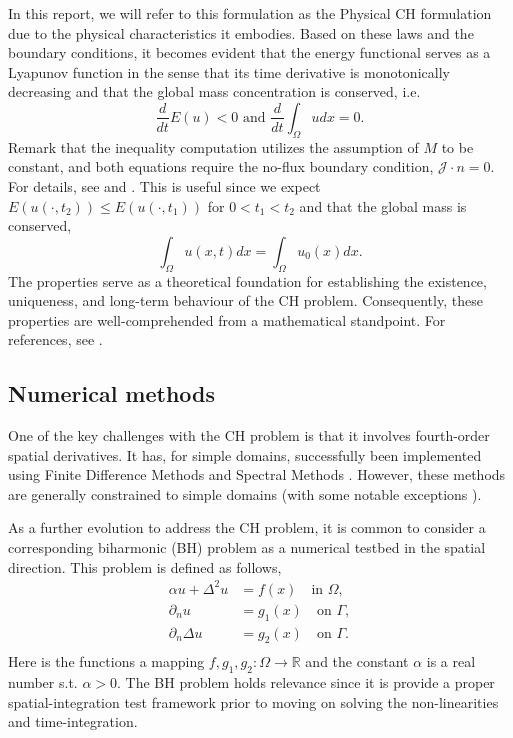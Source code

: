 In this report, we will refer to this formulation as the Physical CH formulation due to the physical characteristics it embodies.
Based on these laws and the boundary conditions, it becomes evident that the energy functional serves as a Lyapunov function in the sense that its time derivative is monotonically decreasing and that the global mass concentration is conserved, i.e.
\begin{equation}
\label{eq:mass_cons_energy_decrease}
\frac{d}{dt} E( u) <  0 \text{ and }\frac{d}{dt} \int_{\Omega }^{}  u dx = 0.
\end{equation}
Remark that the inequality computation utilizes the assumption of $M$ to be constant, and both equations require the no-flux boundary condition, $\mathcal{J} \cdot n = 0$.
For details, see \cite[Equation 17 ]{lee2014physical} and \cite[Equation 1.7]{garcke2020weak}.
This is useful since we expect $E( u( \cdot , t_{2}) ) \le  E( u( \cdot , t_{1}) ) $ for $0 < t_{1} < t_{2} $ and that the global mass is conserved, \[
\int_{\Omega }^{} u ( x,t)  dx = \int_{\Omega }^{} u_{0}(x)  dx.
\]
The properties serve as a theoretical foundation for establishing the existence, uniqueness, and long-term behaviour of the CH problem. Consequently, these properties are well-comprehended from a mathematical standpoint. For
references, see \cite{abels2007convergence, cherfils2011cahn, elliott1986cahn}.

\subsection{Numerical methods}%
\label{sub:numerical_methods}

One of the key challenges with the CH problem is that it involves fourth-order spatial derivatives. It has, for simple domains, successfully been implemented using Finite Difference Methods \cite{furihata2001stable,
cheng2019energy} and Spectral Methods \cite{liu2003phase, he2009class}. However, these methods are generally constrained to simple domains (with some notable exceptions \cite{li2013conservative, shen2009efficient, feng2009fourier}).

As a further evolution to address the CH problem, it is common to consider a corresponding biharmonic (BH) problem as a numerical testbed in the spatial direction. This problem is defined as follows,
\begin{equation}
\label{eq:BH-problem}
\begin{split}
    \alpha u + \Delta ^2 u  & = f( x) \quad \text{in }  \Omega, \\
    \partial _{n} u & = g_{1}( x)  \quad \text{on } \Gamma,   \\
    \partial _{n} \Delta  u & = g_{2}( x)  \quad \text{on } \Gamma.   \\
\end{split}
\end{equation}
Here is the functions a mapping $f,g_{1} ,g_{2}: \Omega  \to \mathbb{R} $ and the constant $\alpha  $ is a real number s.t. $\alpha >0$.
The BH problem holds relevance since it is provide a proper spatial-integration test framework prior to moving on solving the non-linearities and time-integration.

